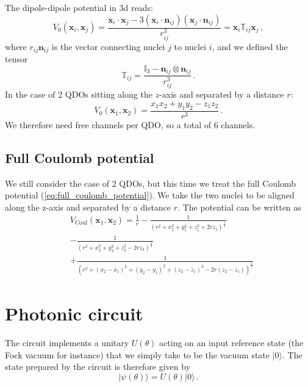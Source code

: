 \documentclass[reprint, amsmath, amssymb, aps]{revtex4-2}
\begin{document}
            The dipole-dipole potential in 3d reads:
            \begin{equation}
                V_0(\bm{x} _i, \bm{x} _j) = \frac{\bm{x} _i\cdot \bm{x} _j - 3 (\bm{x} _i\cdot \bm{n} _{ij})(\bm{x} _j\cdot \bm{n} _{ij})}{r_{ij}^3}=\bm{x} _i \mathbb T_{ij} \bm{x} _j\,,
            \end{equation}
            where $r_{ij}\bm{n} _{ij}$ is the vector connecting nuclei $j$ to nuclei $i$, and we defined the tensor
            \begin{equation}
                \mathbb T_{ij} = \frac{\mathbb I_3 - \bm{n} _{ij}\otimes\bm{n} _{ij}}{r_{ij}^3}\,.
            \end{equation}
            In the case of 2 QDOs sitting along the $z$-axis and separated by a distance $r$:
            \begin{equation}
                V_0(\bm{x} _1, \bm{x} _2) = \frac{x_1x_2 + y_1y_2 - z_1z_2}{r^3}\,.
            \end{equation}
            We therefore need free channels per QDO, so a total of 6 channels.
        \subsection{Full Coulomb potential}

            We still consider the case of 2 QDOs, but this time we treat the full Coulomb potential (\ref{eq:full_coulomb_potential}). We take the two nuclei to be aligned along the z-axis and separated by a distance $r$. The potential can be written as
            \begin{equation}
            \begin{split}
                &V_\text{Coul}(\bm{x} _1, \bm{x} _2) = \frac{1}{r} - \frac{1}{\left(r^2 + x_1^2+y_1^2+z_1^2+2rz_1\right)^{\frac{1}{2}}} \\
                &- \frac{1}{\left(r^2 + x_2^2+y_2^2+z_2^2-2rz_2\right)^{\frac{1}{2}}} \\
                &+\frac{1}{\left(r^2 + (x_2-x_1)^2+(y_2-y_1)^2+(z_2-z_1)^2-2r(z_2-z_1)\right)^{\frac{1}{2}}}
            \end{split}
            \end{equation}

\section{Photonic circuit}

    The circuit implements a unitary $U(\theta)$ acting on an input reference state (the Fock vacuum for instance) that we simply take to be the vacuum state $|0\rangle$. The state prepared by the circuit is therefore given by
    \begin{equation}
        |\psi(\theta)\rangle = U(\theta)|0\rangle\,.
    \end{equation}
\end{document}
